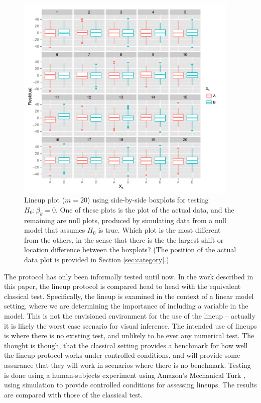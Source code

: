 \documentclass{article}
\begin{document}
\begin{figure}[htp]
   \centering
       \includegraphics[width=0.95\textwidth]{lineup_category.pdf}
       \caption{Lineup plot ($m=20$) using side-by-side boxplots for testing $H_0: \beta_k=0$. One of these plots is the plot of the actual data, and the remaining are null plots, produced by simulating data from a null model that assumes $H_0$ is true. Which plot is the most different from the others, in the sense that there is the the largest shift or location difference between the boxplots? (The position of the actual data plot is provided in Section \ref{sec:category}.)}
       \label{fig:test_category}
\end{figure}

The protocol has only been informally tested until now. In the work described in this paper, the lineup protocol is compared head to head with the equivalent classical test. Specifically, the lineup is examined in the context of a linear model setting, where we are determining the importance of including a variable in the model. This is not the envisioned environment for the use of the lineup -- actually it is likely the worst case scenario for visual inference. The intended use of lineups is where there is no existing test, and unlikely to be ever any numerical test. The thought is though, that the classical setting provides a benchmark for how well the lineup protocol works under controlled conditions, and will provide some assurance that they will work in scenarios where there is no benchmark. Testing is done using a human-subjects experiment using Amazon's Mechanical Turk \citep{turk}, using simulation to provide controlled conditions for assessing lineups. The results are compared with those of the classical test. 
\end{document}
